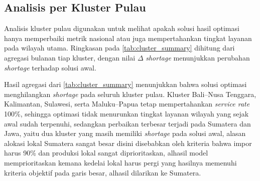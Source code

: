 \documentclass{file/TA-ITS}
\theoremstyle{definition}
\theoremstyle{definition}
\theoremstyle{plain}
\begin{document}
\subsection{Analisis per Kluster Pulau}

Analisis kluster pulau digunakan untuk melihat apakah solusi hasil optimasi hanya memperbaiki metrik nasional atau juga mempertahankan tingkat layanan pada wilayah utama. Ringkasan pada \ref{tab:cluster_summary} dihitung dari agregasi bulanan tiap kluster, dengan nilai $\Delta$ \textit{shortage} menunjukkan perubahan \textit{shortage} terhadap solusi awal.

\begin{table}[H]
\centering
\caption{Ringkasan kinerja per kluster pulau pada solusi hasil optimasi dan perubahan \textit{shortage} terhadap solusi awal}
\label{tab:cluster_summary}
\scriptsize
\setlength{\tabcolsep}{3pt}
\end{table}

Hasil agregasi dari \ref{tab:cluster_summary} menunjukkan bahwa solusi optimasi menghilangkan \textit{shortage} pada seluruh kluster pulau. Kluster Bali--Nusa Tenggara, Kalimantan, Sulawesi, serta Maluku--Papua tetap mempertahankan \textit{service rate} 100\%, sehingga optimasi tidak menurunkan tingkat layanan wilayah yang sejak awal sudah terpenuhi, sedangkan perbaikan terbesar terjadi pada Sumatera dan Jawa, yaitu dua kluster yang masih memiliki \textit{shortage} pada solusi awal, alasan alokasi lokal Sumatera sangat besar disini disebabkan oleh kriteria bahwa impor harus 90\% dan produksi lokal sangat diprioritaskan, alhasil model memprioritaskan kemana kedelai lokal harus pergi yang hasilnya memenuhi kriteria objektif pada garis besar, alhasil dilarikan ke Sumatera.
\end{document}
